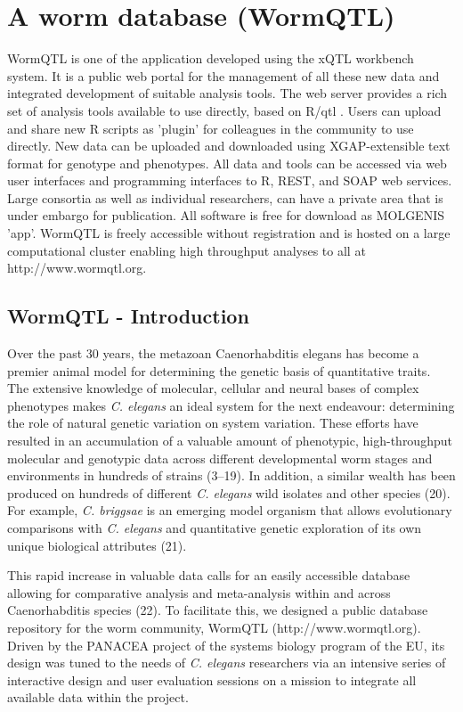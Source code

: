 \documentclass[8pt, twoside, a5paper]{report}
\newcommand{\italic}[1]{\textit{#1}}
\begin{document}
\section{A worm database (WormQTL)}
WormQTL is one of the application developed using the xQTL workbench system. It is a public web portal for the management 
of all these new data and integrated development of suitable analysis tools. The web server provides a rich set of analysis 
tools available to use directly, based on R/qtl \cite{Broman:2003, Arends:2010}. Users can upload and share new R scripts 
as 'plugin' for colleagues in the community to use directly. New data can be uploaded and downloaded using XGAP-extensible 
text format for genotype and phenotypes\cite{Swertz:2010a}. All data and tools can be accessed via web user interfaces and 
programming interfaces to R, REST, and SOAP web services. Large consortia as well as individual researchers, can have a 
private area that is under embargo for publication. All software is free for download as MOLGENIS 'app'\cite{Swertz:2010b}. 
WormQTL is freely accessible without registration and is hosted on a large computational cluster enabling high throughput 
analyses to all at http://www.wormqtl.org.

\subsection{WormQTL - Introduction}
Over the past 30 years, the metazoan Caenorhabditis elegans has become a premier animal model for determining the genetic 
basis of quantitative traits\cite{Gaertner:2010, Kammenga:2008}. The extensive knowledge of molecular, cellular and neural 
bases of complex phenotypes makes \italic{C. elegans} an ideal system for the next endeavour: determining the role of natural genetic 
variation on system variation. These efforts have resulted in an accumulation of a valuable amount of phenotypic, 
high-throughput molecular and genotypic data across different developmental worm stages and environments in hundreds of 
strains (3–19). In addition, a similar wealth has been produced on hundreds of different \italic{C. elegans} wild isolates and 
other species (20). For example, \italic{C. briggsae} is an emerging model organism that allows evolutionary comparisons with 
\italic{C. elegans} and quantitative genetic exploration of its own unique biological attributes (21).

This rapid increase in valuable data calls for an easily accessible database allowing for comparative analysis and meta-analysis 
within and across Caenorhabditis species (22). To facilitate this, we designed a public database repository for the worm community, 
WormQTL (http://www.wormqtl.org). Driven by the PANACEA project of the systems biology program of the EU, its design was tuned 
to the needs of \italic{C. elegans} researchers via an intensive series of interactive design and user evaluation sessions on 
a mission to integrate all available data within the project.
\end{document}
